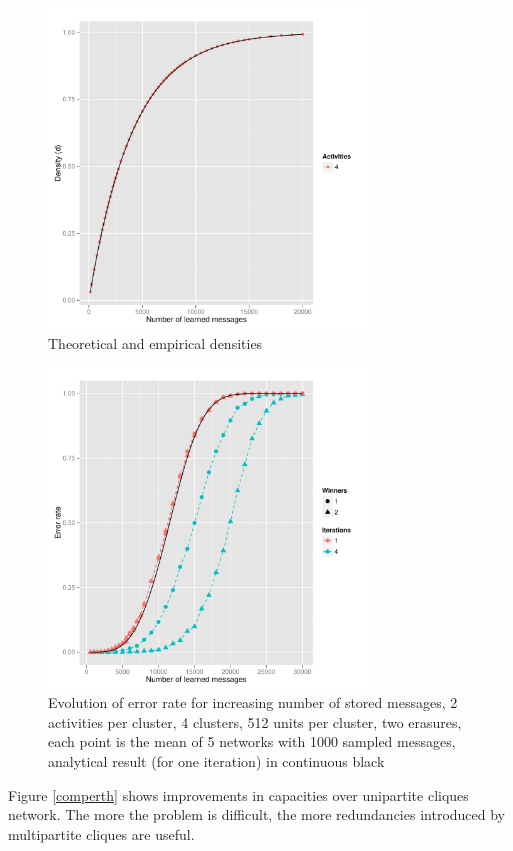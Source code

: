 \documentclass[english,11pt,twocolumn]{IEEEtran}
\theoremstyle{definition}
\begin{document}
		
	\begin{figure}[!htb]
		\includegraphics[width=8.5cm]{Courbes/remplacement_densite_c8l256a4}
		\caption{Theoretical and empirical densities}
			\label{densiteth}
	\end{figure}
	
	
	\begin{figure}[!htb]
		\includegraphics[width=8.5cm]{Courbes/remplacement_figure2g1} %
		\caption{Evolution of error rate for increasing number of stored messages, 2 activities per cluster, 4 clusters, 512 units per cluster, two erasures, each point is the mean of 5 networks with 1000 sampled messages, analytical result (for one iteration) in continuous black}
			\label{erasuresth}
		\end{figure}
		
		Figure \ref{comperth} shows improvements in capacities over unipartite cliques network. The more the problem is difficult, the more redundancies introduced by multipartite cliques are useful.
		
\end{document}
